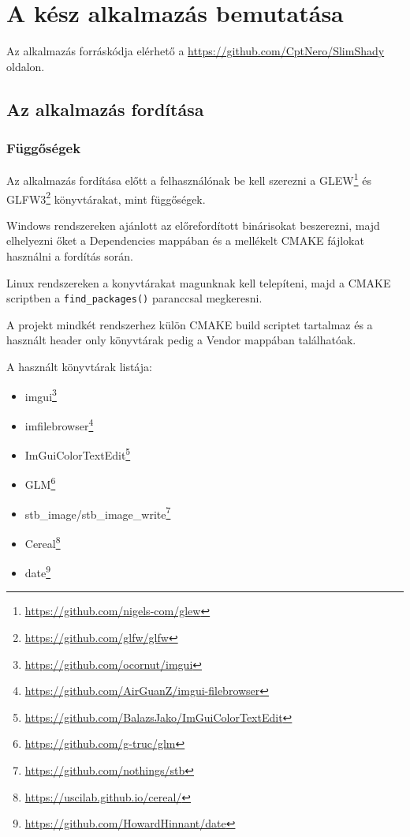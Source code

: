 \chapter{A kész alkalmazás bemutatása}

Az alkalmazás forráskódja elérhető a \url{https://github.com/CptNero/SlimShady} oldalon.

\section{Az alkalmazás fordítása}

\subsection{Függőségek}
Az alkalmazás fordítása előtt a felhasználónak be kell szerezni a GLEW\footnote{\url{https://github.com/nigels-com/glew}} és GLFW3\footnote{\url{https://github.com/glfw/glfw}} könyvtárakat, mint függőségek.

Windows rendszereken ajánlott az előrefordított binárisokat beszerezni, majd elhelyezni őket a Dependencies mappában és a mellékelt CMAKE fájlokat használni a fordítás során.

Linux rendszereken a konyvtárakat magunknak kell telepíteni, majd a CMAKE scriptben a \texttt{find_packages()} paranccsal megkeresni.

A projekt mindkét rendszerhez külön CMAKE build scriptet tartalmaz és a használt header only könyvtárak pedig a Vendor mappában találhatóak.

\newpage
A használt könyvtárak listája:
\begin{itemize}
    \item imgui\footnote{\url{https://github.com/ocornut/imgui}}
    \item imfilebrowser\footnote{\url{https://github.com/AirGuanZ/imgui-filebrowser}}
    \item ImGuiColorTextEdit\footnote{\url{https://github.com/BalazsJako/ImGuiColorTextEdit}}
    \item GLM\footnote{\url{https://github.com/g-truc/glm}}
    \item stb\_image/stb\_image\_write\footnote{\url{https://github.com/nothings/stb}}
    \item Cereal\footnote{\url{https://uscilab.github.io/cereal/}}
    \item date\footnote{\url{https://github.com/HowardHinnant/date}}
\end{itemize}

